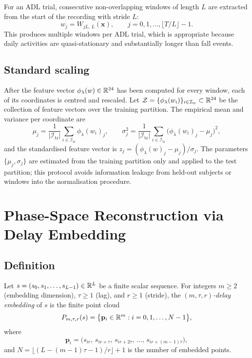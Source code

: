 For an ADL trial, consecutive non-overlapping windows of length $L$ are extracted from the start of the recording with stride $L$:
\begin{equation}
  w_j=W_{jL,\,L}(\mathbf{x}),\qquad j=0,1,\ldots,\lfloor T/L\rfloor-1.
  \label{eq:adl-window}
\end{equation}
This produces multiple windows per ADL trial, which is appropriate because daily activities are quasi-stationary and substantially longer than fall events.

\subsection{Standard scaling}
\label{subsubsec:scaling}

After the feature vector $\phi_\lambda(w)\in\mathbb{R}^{24}$ has been computed for every window, each of its coordinates is centred and rescaled. Let $\mathcal{Z}=\{\phi_\lambda(w_i)\}_{i\in\mathcal{I}_{\mathrm{tr}}}\subset\mathbb{R}^{24}$ be the collection of feature vectors over the training partition. The empirical mean and variance per coordinate are
\[
  \mu_j=\frac{1}{|\mathcal{I}_{\mathrm{tr}}|}\sum_{i\in\mathcal{I}_{\mathrm{tr}}}\phi_\lambda(w_i)_j,
  \qquad
  \sigma_j^2=\frac{1}{|\mathcal{I}_{\mathrm{tr}}|}\sum_{i\in\mathcal{I}_{\mathrm{tr}}}\bigl(\phi_\lambda(w_i)_j-\mu_j\bigr)^2,
\]
and the standardised feature vector is $z_j=(\phi_\lambda(w)_j-\mu_j)/\sigma_j$. The parameters $\{\mu_j,\sigma_j\}$ are estimated from the training partition only and applied to the test partition; this protocol avoids information leakage from held-out subjects or windows into the normalisation procedure.

\section{Phase-Space Reconstruction via Delay Embedding}
\label{subsec:embedding}

\subsection{Definition}
\label{subsubsec:delay_def}

\begin{definition}
\label{def:delay}
Let $s=(s_0,s_1,\ldots,s_{L-1})\in\mathbb{R}^L$ be a finite scalar sequence. For integers $m\geq 2$ (embedding dimension), $\tau\geq 1$ (lag), and $r\geq 1$ (stride), the \emph{$(m,\tau,r)$-delay embedding} of $s$ is the finite point cloud
\begin{equation}
  P_{m,\tau,r}(s)=\bigl\{\mathbf{p}_i\in\mathbb{R}^m:i=0,1,\ldots,N-1\bigr\},
  \label{eq:delay-emb}
\end{equation}
where
\[
  \mathbf{p}_i=\bigl(s_{ir},\,s_{ir+\tau},\,s_{ir+2\tau},\,\ldots,\,s_{ir+(m-1)\tau}\bigr),
\]
and $N=\lfloor(L-(m-1)\tau-1)/r\rfloor+1$ is the number of embedded points.
\end{definition}

